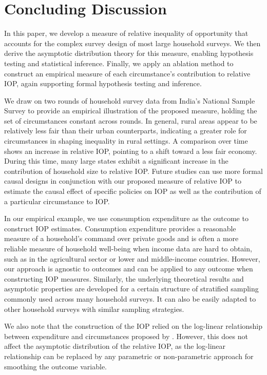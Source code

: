 \documentclass[12pt]{article}
\theoremstyle{plain}
\theoremstyle{definition}
\begin{document}
\section{Concluding Discussion}
\label{sec:conclusion}

In this paper, we develop a measure of relative inequality of opportunity that accounts for the complex survey design of most large household surveys. We then derive the asymptotic distribution theory for this measure, enabling hypothesis testing and statistical inference. Finally, we apply an ablation method to construct an empirical measure of each circumstance's contribution to relative IOP, again supporting formal hypothesis testing and inference.

We draw on two rounds of household survey data from India’s National Sample Survey to provide an empirical illustration of the proposed measure, holding the set of circumstances constant across rounds. In general, rural areas appear to be relatively less fair than their urban counterparts, indicating a greater role for circumstances in shaping inequality in rural settings. A comparison over time shows an increase in relative IOP, pointing to a shift toward a less fair economy. During this time, many large states exhibit a significant increase in the contribution of household size to relative IOP. Future studies can use more formal causal designs in conjunction with our proposed measure of relative IOP to estimate the causal effect of specific policies on IOP as well as the contribution of a particular circumstance to IOP.

In our empirical example, we use consumption expenditure as the outcome to construct IOP estimates. Consumption expenditure provides a reasonable measure of a household's command over private goods and is often a more reliable measure of household well-being when income data are hard to obtain, such as in the agricultural sector or lower and middle-income countries. However, our approach is agnostic to outcomes and can be applied to any outcome when constructing IOP measures. Similarly, the underlying theoretical results and asymptotic properties are developed for a certain structure of stratified sampling commonly used across many household surveys. It can also be easily adapted to other household surveys with similar sampling strategies. 

We also note that the construction of the IOP relied on the log-linear relationship between expenditure and circumstances proposed by \cite{ferreira2011measurement}. However, this does not affect the asymptotic distribution of the relative IOP, as the log-linear relationship can be replaced by any parametric or non-parametric approach for smoothing the outcome variable.
\end{document}
